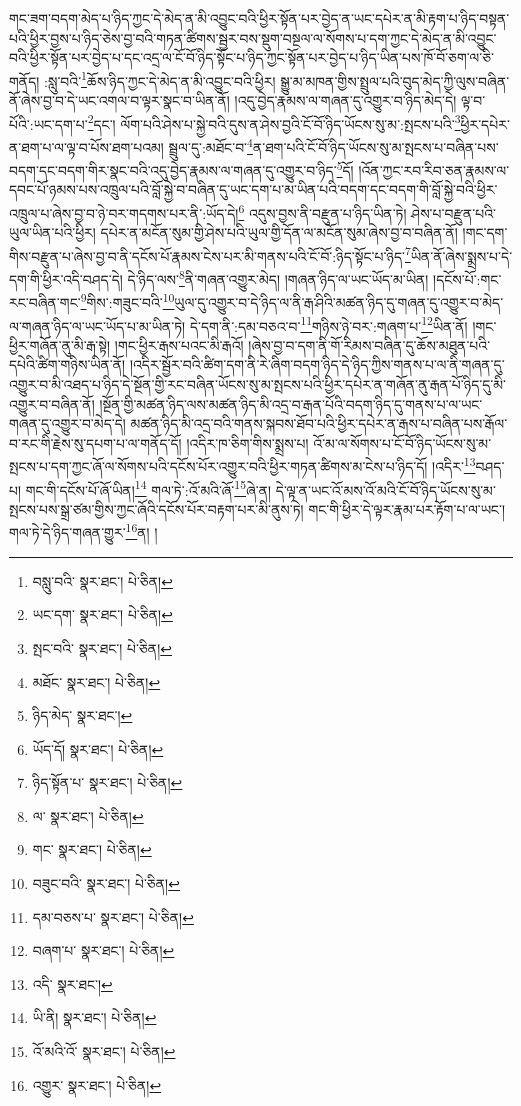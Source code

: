 གང་ཟག་བདག་མེད་པ་ཉིད་ཀྱང་དེ་མེད་ན་མི་འབྱུང་བའི་ཕྱིར་སྟོན་པར་བྱེད་ན་ཡང་དཔེར་ན་མི་རྟག་པ་ཉིད་བསྟན་པའི་ཕྱིར་བྱས་པ་ཉིད་ཅེས་བྱ་བའི་གཏན་ཚིགས་སྦྱར་བས་སྡུག་བསྔལ་ལ་སོགས་པ་དག་ཀྱང་དེ་མེད་ན་མི་འབྱུང་བའི་ཕྱིར་སྟོན་པར་བྱེད་པ་དང་འདྲ་ལ་ངོ་བོ་ཉིད་སྟོང་པ་ཉིད་ཀྱང་སྟོན་པར་བྱེད་པ་ཉིད་ཡིན་པས་ཁོ་བོ་ཅག་ལ་ཅི་གནོད། :སླུ་བའི་\footnote{བསླུ་བའི་  སྣར་ཐང་།  པེ་ཅིན། }ཆོས་ཉིད་ཀྱང་དེ་མེད་ན་མི་འབྱུང་བའི་ཕྱིར། སྒྱུ་མ་མཁན་གྱིས་སྤྲུལ་པའི་བུད་མེད་ཀྱི་ལུས་བཞིན་ནོ་ཞེས་བྱ་བ་དེ་ཡང་འགལ་བ་ལྟར་སྣང་བ་ཡིན་ནོ། །འདུ་བྱེད་རྣམས་ལ་གཞན་དུ་འགྱུར་བ་ཉིད་མེད་དེ། ལྟ་བ་པོའི་:ཡང་དག་པ་\footnote{ཡང་དག་  སྣར་ཐང་།  པེ་ཅིན། }དང་། ལོག་པའི་ཤེས་པ་སྐྱེ་བའི་དུས་ན་ཤེས་བྱའི་ངོ་བོ་ཉིད་ཡོངས་སུ་མ་:སྤངས་པའི་\footnote{སྤང་བའི་  སྣར་ཐང་།  པེ་ཅིན། }ཕྱིར་དཔེར་ན་ཐག་པ་ལ་ལྟ་བ་པོས་ཐག་པའམ། སྦྲུལ་དུ་:མཐོང་བ་\footnote{མཐོང་  སྣར་ཐང་།  པེ་ཅིན། }ན་ཐག་པའི་ངོ་བོ་ཉིད་ཡོངས་སུ་མ་སྤངས་པ་བཞིན་པས་བདག་དང་བདག་གིར་སྣང་བའི་འདུ་བྱེད་རྣམས་ལ་གཞན་དུ་འགྱུར་བ་ཉིད་\footnote{ཉིད་མེད་  སྣར་ཐང་། }དོ། །འོན་ཀྱང་རབ་རིབ་ཅན་རྣམས་ལ་དབང་པོ་ཉམས་པས་འཁྲུལ་པའི་བློ་སྐྱེ་བ་བཞིན་དུ་ཡང་དག་པ་མ་ཡིན་པའི་བདག་དང་བདག་གི་བློ་སྐྱེ་བའི་ཕྱིར་འཁྲུལ་པ་ཞེས་བྱ་བ་ཉེ་བར་གདགས་པར་ནི་:ཡོད་དེ།\footnote{ཡོད་དོ།  སྣར་ཐང་།  པེ་ཅིན། } འདུས་བྱས་ནི་བརྫུན་པ་ཉིད་ཡིན་ཏེ། ཤེས་པ་བརྫུན་པའི་ཡུལ་ཡིན་པའི་ཕྱིར། དཔེར་ན་མངོན་སུམ་གྱི་ཤེས་པའི་ཡུལ་གྱི་དོན་ལ་མངོན་སུམ་ཞེས་བྱ་བ་བཞིན་ནོ། །གང་དག་གིས་བརྫུན་པ་ཞེས་བྱ་བ་ནི་དངོས་པོ་རྣམས་ངེས་པར་མི་གནས་པའི་ངོ་བོ་:ཉིད་སྟོང་པ་ཉིད་\footnote{ཉིད་སྟོན་པ་  སྣར་ཐང་།  པེ་ཅིན། }ཡིན་ནོ་ཞེས་སྨྲས་པ་དེ་དག་གི་ཕྱིར་འདི་བཤད་དེ། དེ་ཉིད་ལས་\footnote{ལ་  སྣར་ཐང་།  པེ་ཅིན། }ནི་གཞན་འགྱུར་མེད། །གཞན་ཉིད་ལ་ཡང་ཡོད་མ་ཡིན། །དངོས་པོ་:གང་རང་བཞིན་གང་\footnote{གང་  སྣར་ཐང་།  པེ་ཅིན། }གིས་:གཟུང་བའི་\footnote{བཟུང་བའི་  སྣར་ཐང་།  པེ་ཅིན། }ཡུལ་དུ་འགྱུར་བ་དེ་ཉིད་ལ་ནི་རྒ་ཤིའི་མཚན་ཉིད་དུ་གཞན་དུ་འགྱུར་བ་མེད་ལ་གཞན་ཉིད་ལ་ཡང་ཡོད་པ་མ་ཡིན་ཏེ། དེ་དག་ནི་:དམ་བཅའ་བ་\footnote{དམ་བཅས་པ་  སྣར་ཐང་།  པེ་ཅིན། }གཉིས་ཉེ་བར་:གཞག་པ་\footnote{བཞག་པ་  སྣར་ཐང་།  པེ་ཅིན། }ཡིན་ནོ། །གང་ཕྱིར་གཞོན་ནུ་མི་རྒ་སྟེ། །གང་ཕྱིར་རྒས་པའང་མི་རྒའོ། །ཞེས་བྱ་བ་དག་ནི་གོ་རིམས་བཞིན་དུ་ཆོས་མཐུན་པའི་དཔེའི་ཚིག་གཉིས་ཡིན་ནོ། །འདིར་སྦྱོར་བའི་ཚིག་དག་ནི་རེ་ཞིག་བདག་ཉིད་དེ་ཉིད་ཀྱིས་གནས་པ་ལ་ནི་གཞན་དུ་འགྱུར་བ་མི་འཐད་པ་ཉིད་དེ་སྔོན་གྱི་རང་བཞིན་ཡོངས་སུ་མ་སྤངས་པའི་ཕྱིར་དཔེར་ན་གཞོན་ནུ་རྒན་པོ་ཉིད་དུ་མི་འགྱུར་བ་བཞིན་ནོ། །སྔོན་གྱི་མཚན་ཉིད་ལས་མཚན་ཉིད་མི་འདྲ་བ་རྒན་པོའི་བདག་ཉིད་དུ་གནས་པ་ལ་ཡང་གཞན་དུ་འགྱུར་བ་མེད་དེ། མཚན་ཉིད་མི་འདྲ་བའི་གནས་སྐབས་ཐོབ་པའི་ཕྱིར་དཔེར་ན་རྒས་པ་བཞིན་པས་རྒོལ་བ་རང་གི་རྗེས་སུ་དཔག་པ་ལ་གནོད་དོ། །འདིར་ཁ་ཅིག་གིས་སྨྲས་པ། འོ་མ་ལ་སོགས་པ་ངོ་བོ་ཉིད་ཡོངས་སུ་མ་སྤངས་པ་དག་ཀྱང་ཞོ་ལ་སོགས་པའི་དངོས་པོར་འགྱུར་བའི་ཕྱིར་གཏན་ཚིགས་མ་ངེས་པ་ཉིད་དོ། །འདིར་\footnote{འདི་  སྣར་ཐང་། }བཤད་པ། གང་གི་དངོས་པོ་ཞོ་ཡིན།\footnote{ཡི་ནི།  སྣར་ཐང་།  པེ་ཅིན། } གལ་ཏེ་:འོ་མའི་ཞོ་\footnote{འོ་མའི་འོ་  སྣར་ཐང་།  པེ་ཅིན། }ཞེ་ན། དེ་ལྟ་ན་ཡང་འོ་མས་འོ་མའི་ངོ་བོ་ཉིད་ཡོངས་སུ་མ་སྤངས་པས་སྒྲ་ཙམ་གྱིས་ཀྱང་ཞོའི་དངོས་པོར་བརྟག་པར་མི་ནུས་ཏེ། གང་གི་ཕྱིར་དེ་ལྟར་རྣམ་པར་རྟོག་པ་ལ་ཡང་། གལ་ཏེ་དེ་ཉིད་གཞན་གྱུར་\footnote{འགྱུར་  སྣར་ཐང་།  པེ་ཅིན། }ན། །
